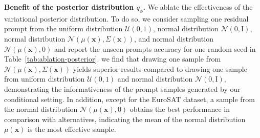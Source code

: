 \documentclass[10pt,twocolumn,letterpaper]{article}
\newcommand{\x}{\mathbf{x}}
\begin{document}
\textbf{Benefit of the posterior distribution $q_\phi$.}
We ablate the effectiveness of the variational posterior distribution. To do so, we consider sampling one residual prompt from the uniform distribution 
$\mathcal{U}(\text{0},\text{1})$, normal distribution $\mathcal{N}(\text{0},\text{I})$, 
normal distribution $\mathcal{N}( \mu(\x), \Sigma(\x ))$, and normal distribution $\mathcal{N}( \mu(\x), \text{0})$ and report the unseen prompts accuracy for one random seed in Table~\ref{tab:ablation-posterior}. 
we find that drawing one sample from $\mathcal{N}( \mu(\x), \Sigma(\x ))$ yields superior results compared to drawing one sample from uniform distribution $\mathcal{U}(\text{0},\text{1})$ and normal distribution $\mathcal{N}(\text{0},\text{I})$, demonstrating the informativeness of the prompt samples generated by our conditional setting.
In addition, except for the EuroSAT dataset, a sample from the normal distribution $\mathcal{N}( \mu(\x), \text{0})$ obtains the best performance in comparison with alternatives, indicating the mean of the normal distribution $\mu(\x)$ is the most effective sample. 


\begin{table}[t]
\centering
\caption{\textbf{Influence of Monte Carlo sampling} on
unseen prompts accuracy. As demonstrated, increasing the number
of Monte Carlo samples boosts performance initially but
reaches a plateau after 20 samples for all datasets.
}
\vspace{-2mm}
\label{tab:ablation-mc}

\end{table}
\end{document}
